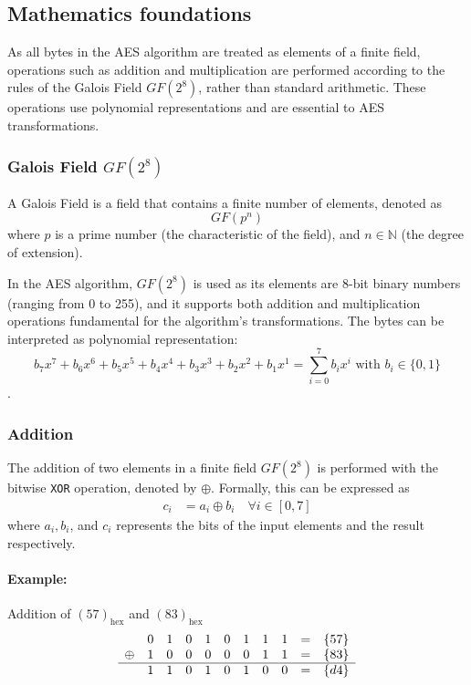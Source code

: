 \subsection{Mathematics foundations}

As all bytes in the \gls{AES} algorithm are treated as elements of a finite field, operations such as addition and multiplication are performed according to the rules of the Galois Field $GF(2^8)$, rather than standard arithmetic. 
These operations use polynomial representations and are essential to \gls{AES} transformations.


\subsubsection{Galois Field $GF(2^8)$}
\label{sec:gf}

A Galois Field is a field that contains a finite number of elements, denoted as
\begin{equation}
    GF(p^n)
\end{equation}
where $p$ is a prime number (the characteristic of the field), and $n \in \mathbb{N}$ (the degree of extension).

In the AES algorithm, $GF(2^8)$ is used as its elements are 8-bit binary numbers (ranging from 0 to 255), and it supports both addition and multiplication operations fundamental for the algorithm's transformations.
The bytes can be interpreted as polynomial representation:
\begin{equation}
    b_7 x^7 + b_6 x^6 + b_5 x^5 + b_4 x^4 + b_3 x^3 + b_2 x^2 + b_1 x^1 = \sum_{i=0}^7 b_i x^i \text{ with } b_i \in \{0,1\}
    \label{eq:gf2^8}
\end{equation}.


\subsubsection{Addition}
\label{sec:addition}

The addition of two elements in a finite field $GF(2^8)$ is performed with the bitwise \texttt{XOR} operation, denoted by $\oplus$.
Formally, this can be expressed as
\begin{align}
    c_i &= a_i \oplus b_i \quad \forall i \in [0, 7]
\end{align}
where $a_i, b_i$, and $c_i$ represents the bits of the input elements and the result respectively.


\paragraph{Example:} Addition of $(57)_{\text{hex}}$ and $(83)_{\text{hex}}$
\[
\begin{array}{ccccccccccc}
     & 0 & 1 & 0 & 1 & 0 & 1 & 1 & 1 & = & \{57\} \\
\oplus & 1 & 0 & 0 & 0 & 0 & 0 & 1 & 1 & = & \{83\} \\
\hline
     & 1 & 1 & 0 & 1 & 0 & 1 & 0 & 0 & = & \{d4\} \\
\end{array}
\]

